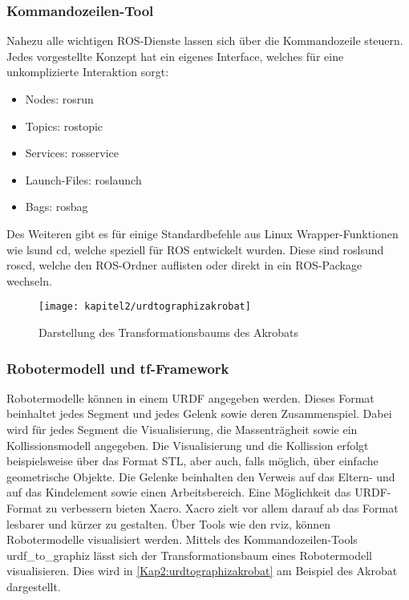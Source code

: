 \subsubsection{Kommandozeilen-Tool}

Nahezu alle wichtigen \ac{ROS}-Dienste lassen sich über die Kommandozeile steuern. Jedes vorgestellte Konzept hat ein eigenes Interface, welches für eine unkomplizierte Interaktion sorgt:
\begin{itemize}
\item Nodes: rosrun
\item Topics: rostopic
\item Services: rosservice
\item Launch-Files: roslaunch
\item Bags: rosbag
\end{itemize}

Des Weiteren gibt es für einige Standardbefehle aus Linux Wrapper-Funktionen wie \glq ls\grq und \glq cd\grq, welche speziell für \ac{ROS} entwickelt wurden. Diese sind \glq rosls\grq und \glq roscd\grq, welche den \ac{ROS}-Ordner auflisten oder direkt in ein \ac{ROS}-Package wechseln.

\begin{figure}[t!]
  \centering
  \texttt{[image: kapitel2/urdtographizakrobat]}
  \caption{Darstellung des Transformationsbaums des Akrobats}
  \label{Kap2:urdtographizakrobat}
\end{figure}

\subsubsection{Robotermodell und tf-Framework}

Robotermodelle können in einem \ac{URDF} angegeben werden. Dieses Format beinhaltet jedes Segment und jedes Gelenk sowie deren Zusammenspiel. Dabei wird für jedes Segment die Visualisierung, die Massenträgheit sowie ein Kollissionsmodell angegeben. Die Visualisierung und die Kollission erfolgt beispielsweise über das Format \ac{STL}, aber auch, falls möglich, über einfache geometrische Objekte. Die Gelenke beinhalten den Verweis auf das Eltern- und auf das Kindelement sowie einen Arbeitsbereich. Eine Möglichkeit das \ac{URDF}-Format zu verbessern bieten \ac{Xacro}. \ac{Xacro} zielt vor allem darauf ab das Format lesbarer und kürzer zu gestalten. Über Tools wie den rviz, können Robotermodelle visualisiert werden. Mittels des Kommandozeilen-Tools urdf\_to\_graphiz lässt sich der Transformationsbaum eines Robotermodell visualisieren. Dies wird in \autoref{Kap2:urdtographizakrobat} am Beispiel des Akrobat dargestellt.


